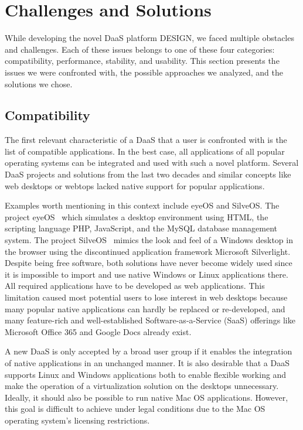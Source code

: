 \documentclass[runningheads]{llncs}
\begin{document}
\section{Challenges and Solutions}
\label{sec:AnalysisPossibleComponents}


While developing the novel DaaS platform DESIGN, we faced multiple obstacles and challenges. Each of these issues belongs to one of these four categories: compatibility, performance, stability, and usability. This section presents the issues we were confronted with, the possible approaches we analyzed, and the solutions we chose.

\subsection{Compatibility}
% 

The first relevant characteristic of a DaaS that a user is confronted with is the list of compatible applications. In the best case, all applications of all popular operating systems can be integrated and used with such a novel platform. Several DaaS projects and solutions from the last two decades and similar concepts like web desktops or webtops lacked native support for popular applications. 

Examples worth mentioning in this context include eyeOS and SilveOS. The project eyeOS~\cite{liu2012research,vidyabanu2011implementation} which simulates a desktop environment using HTML, the scripting language PHP, JavaScript, and the MySQL database management system. The project SilveOS~\cite{garmpis2016design} mimics the look and feel of a Windows desktop in the browser using the discontinued application framework Microsoft Silverlight. Despite being free software, both solutions have never become widely used since it is impossible to import and use native Windows or Linux applications there. All required applications have to be developed as web applications. This limitation caused most potential users to lose interest in web desktops because many popular native applications can hardly be replaced or re-developed, and many feature-rich and well-established Software-as-a-Service (SaaS) offerings like Microsoft Office 365 and Google Docs already exist.

A new DaaS is only accepted by a broad user group if it enables the integration of native applications in an unchanged manner. It is also desirable that a DaaS supports Linux and Windows applications both to enable flexible working and make the operation of a virtualization solution on the desktops unnecessary. Ideally, it should also be possible to run native Mac OS applications. However, this goal is difficult to achieve under legal conditions due to the Mac OS operating system's licensing restrictions.
\end{document}

